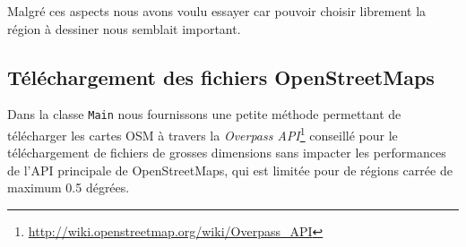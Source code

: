 \documentclass[11pt,a4paper]{article}
\begin{document}
Malgré ces aspects nous avons voulu essayer car pouvoir choisir librement la région à dessiner nous semblait important.

\subsection{Téléchargement des fichiers OpenStreetMaps}
Dans la classe \texttt{Main} nous fournissons une petite méthode permettant de télécharger les cartes OSM à travers la \textit{Overpass API}\footnote{\url{http://wiki.openstreetmap.org/wiki/Overpass_API}} conseillé pour le téléchargement de fichiers de grosses dimensions sans impacter les performances de l'API principale de OpenStreetMaps, qui est limitée pour de régions carrée de maximum 0.5 dégrées.
\end{document}
